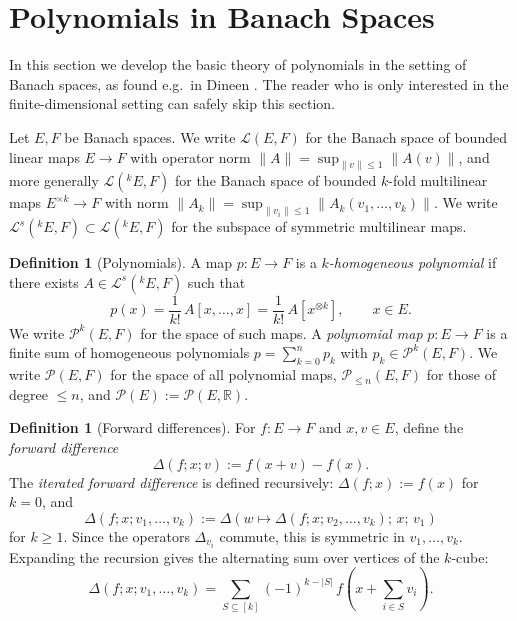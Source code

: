 \documentclass[10pt,a4paper]{article}
\theoremstyle{plain}
\theoremstyle{definition}
\newtheorem{definition}[theorem]{Definition}
\newcommand{\IR}{\mathbb{R}} %
\newcommand{\1}{\mathbb{1}} %
\newcommand{\tensor}{\otimes} %
\newcommand{\KL}{\mathcal{L}}
\begin{document}
\section{Polynomials in Banach
Spaces}\label{polynomials-in-banach-spaces}

In this section we develop the basic theory of polynomials in the
setting of Banach spaces, as found e.g.~in Dineen \citep{Dineen1999}.
The reader who is only interested in the finite-dimensional setting can
safely skip this section.

Let \(E, F\) be Banach spaces. We write \(\KL(E, F)\) for the Banach
space of bounded linear maps \(E \to F\) with operator norm
\(\|A\| = \sup_{\|v\| \leq 1} \|A(v)\|\), and more generally
\(\KL(^k E, F)\) for the Banach space of bounded \(k\)-fold multilinear
maps \(E^{\times k} \to F\) with norm
\(\|A_k\| = \sup_{\|v_i\| \leq 1} \|A_k(v_1,\dots,v_k)\|\). We write
\(\KL^s(^k E, F) \subset \KL(^k E, F)\) for the subspace of symmetric
multilinear maps.

\begin{definition}[Polynomials]

A map \(p: E\to F\) is a \emph{\(k\)-homogeneous polynomial} if there
exists \(A \in \KL^s(^k E,F)\) such that \[
  p(x)=\frac{1}{k!}\,A[x,\dots,x]=\frac{1}{k!}\,A[x^{\tensor k}], \qquad x\in E.
\] We write \(\mathcal{P}^k(E,F)\) for the space of such maps. A
\emph{polynomial map} \(p: E \to F\) is a finite sum of homogeneous
polynomials \(p = \sum_{k=0}^n p_k\) with
\(p_k \in \mathcal{P}^k(E,F)\). We write \(\mathcal{P}(E,F)\) for the
space of all polynomial maps, \(\mathcal{P}_{\le n}(E,F)\) for those of
degree \(\le n\), and \(\mathcal{P}(E) := \mathcal{P}(E,\IR)\).

\end{definition}

\begin{definition}[Forward differences]

For \(f: E \to F\) and \(x, v \in E\), define the \emph{forward
difference} \[
  \Delta(f; x; v) := f(x + v) - f(x).
\] The \emph{iterated forward difference} is defined recursively:
\(\Delta(f; x) := f(x)\) for \(k = 0\), and \[
  \Delta(f; x; v_1, \dots, v_k) := \Delta(w \mapsto \Delta(f; x; v_2, \dots, v_k);\, x;\, v_1)
\] for \(k \geq 1\). Since the operators \(\Delta_{v_i}\) commute, this
is symmetric in \(v_1, \dots, v_k\). Expanding the recursion gives the
alternating sum over vertices of the \(k\)-cube: \[
  \Delta(f; x; v_1, \dots, v_k) = \sum_{S \subseteq [k]} (-1)^{k - |S|}\, f(x + \textstyle\sum_{i \in S} v_i).
\]

\end{definition}
\end{document}
